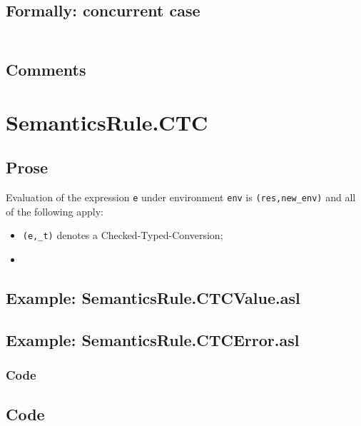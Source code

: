 \documentclass{book}
\begin{document}
  \subsection{Formally: concurrent case}
  \begin{align}
  \end{align} 

  \subsection{Comments}

\section{SemanticsRule.CTC \label{sec:SemanticsRule.CTC}}

  \subsection{Prose}
  Evaluation of the expression \texttt{e} under environment \texttt{env} is
  \texttt{(res,new\_env)} and all of the following apply:
  \begin{itemize}
  \item \texttt{(e,\_t)} denotes a Checked-Typed-Conversion;
  \item 
  \end{itemize} 

  \subsection{Example: SemanticsRule.CTCValue.asl}

  \subsection{Example: SemanticsRule.CTCError.asl}

  \subsubsection{Code}

  \subsection{Code}
\end{document}
